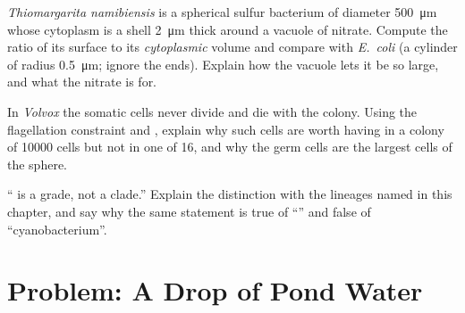 \begin{exercise}[$\star\star\star$]\label{exo:b2:unicellular-diversity:10}
\emph{Thiomargarita namibiensis} is a spherical sulfur bacterium of
diameter \qty{500}{\micro m} whose cytoplasm is a shell
\qty{2}{\micro m} thick around a vacuole of nitrate. Compute the
ratio of its surface to its \emph{cytoplasmic} volume and compare
with \emph{E.~coli} (a cylinder of radius \qty{0.5}{\micro m};
ignore the ends). Explain how the vacuole lets it be so large, and
what the nitrate is for.
\end{exercise}

\begin{exercise}[$\star\star\star$]\label{exo:b2:unicellular-diversity:11}
In \emph{Volvox} the somatic cells never divide and die with the
colony. Using the flagellation constraint and , explain
why such cells are worth having in a colony of \num{10000} cells but
not in one of 16, and why the germ cells are the largest cells of the
sphere.
\end{exercise}

\begin{exercise}[$\star\star\star$]\label{exo:b2:unicellular-diversity:12}
`` is a grade, not a clade.'' Explain the distinction with the
lineages named in this chapter, and say why the same statement is
true of ``'' and false of ``cyanobacterium''.
\end{exercise}

\section{Problem: A Drop of Pond Water}

